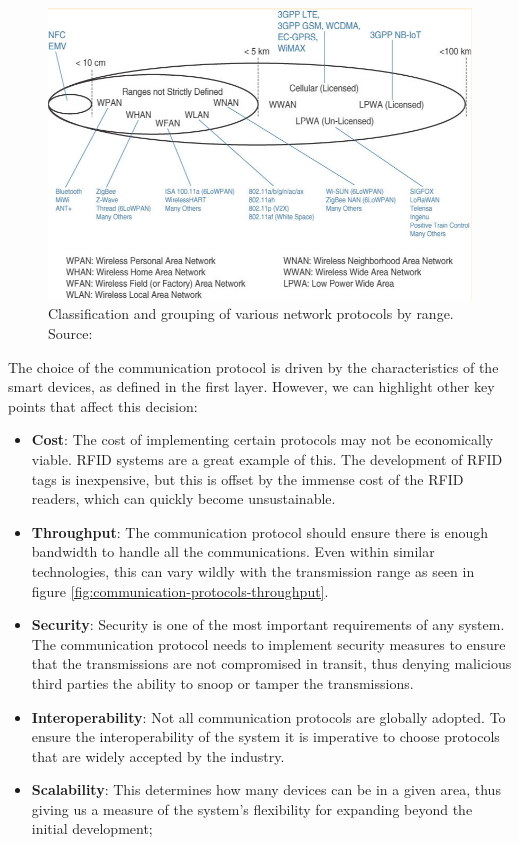 \begin{figure}[H]
    \centering
    \includegraphics[width=0.85\linewidth]{images/communication-protocols.png}
    \caption[Classification and grouping of various network protocols by range.]{ Classification and grouping of various network protocols by range. Source: \cite{10.5555/3161403}}
    \label{fig:communication-protocols}
\end{figure}


The choice of the communication protocol is driven by the characteristics of the smart devices, as defined in the first layer. However, we can highlight other key points that affect this decision:

\begin{itemize}
    \item \textbf{Cost}: The cost of implementing certain protocols may not be economically viable. \acs{RFID} systems are a great example of this. The development of \acs{RFID} tags is inexpensive, but this is offset by the immense cost of the \acs{RFID} readers, which can quickly become unsustainable.
    \item \textbf{Throughput}: The communication protocol should ensure there is enough bandwidth to handle all the communications. Even within similar technologies, this can vary wildly with the transmission range as seen in figure \ref{fig:communication-protocols-throughput}.
    \item \textbf{Security}: Security is one of the most important requirements of any system. The communication protocol needs to implement security measures to ensure that the transmissions are not compromised in transit, thus denying malicious third parties the ability to snoop or tamper the transmissions.
    \item \textbf{Interoperability}: Not all communication protocols are globally adopted. To ensure the interoperability of the system it is imperative to choose protocols that are widely accepted by the industry.
    \item \textbf{Scalability}: This determines how many devices can be in a given area, thus giving us a measure of the system's flexibility for expanding beyond the initial development;
\end{itemize}

